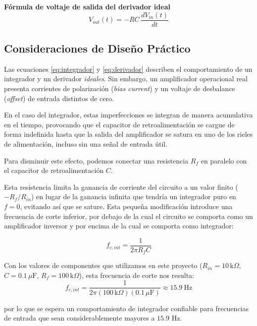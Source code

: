 \documentclass[conference]{IEEEtran}
\begin{document}
\textbf{Fórmula de voltaje de salida del derivador ideal}
\begin{equation}
V_{out}(t) = -RC\,\frac{dV_{in}(t)}{dt}
\label{eq:derivador}
\end{equation}

\subsection{Consideraciones de Diseño Práctico}
Las ecuaciones \eqref{eq:integrador} y \eqref{eq:derivador} describen el comportamiento de un integrador y un derivador \textit{ideales}. Sin embargo, un amplificador operacional real presenta corrientes de polarización (\textit{bias current}) y un voltaje de desbalance (\textit{offset}) de entrada distintos de cero.

En el caso del integrador, estas imperfecciones se integran de manera acumulativa en el tiempo, provocando que el capacitor de retroalimentación se cargue de forma indefinida hasta que la salida del amplificador se satura en uno de los rieles de alimentación, incluso sin una señal de entrada útil.

Para disminuir este efecto, podemos conectar una resistencia $R_f$ en paralelo con el capacitor de retroalimentación $C$.

Esta resistencia limita la ganancia de corriente del circuito a un valor finito ($-R_f/R_{in}$) en lugar de la ganancia infinita que tendría un integrador puro en $f=0$, evitando así que se sature. Esta pequeña modificación introduce una frecuencia de corte inferior, por debajo de la cual el circuito se comporta como un amplificador inversor y por encima de la cual se comporta como integrador:

\begin{equation}
f_{c,int} = \frac{1}{2\pi R_f C}
\label{eq:fc_int}
\end{equation}

Con los valores de componentes que utilizamos en este proyecto ($R_{in}=10\,\text{k}\Omega$, $C=0.1\,\mu\text{F}$, $R_f=100\,\text{k}\Omega$), esta frecuencia de corte nos resulta:
\begin{equation}
f_{c,int} = \frac{1}{2\pi (100\,\text{k}\Omega)(0.1\,\mu\text{F})} \approx 15.9\ \text{Hz}
\label{eq:fc_int_valor}
\end{equation}

por lo que se espera un comportamiento de integrador confiable para frecuencias de entrada que sean considerablemente mayores a $15.9$ Hz.
\end{document}
